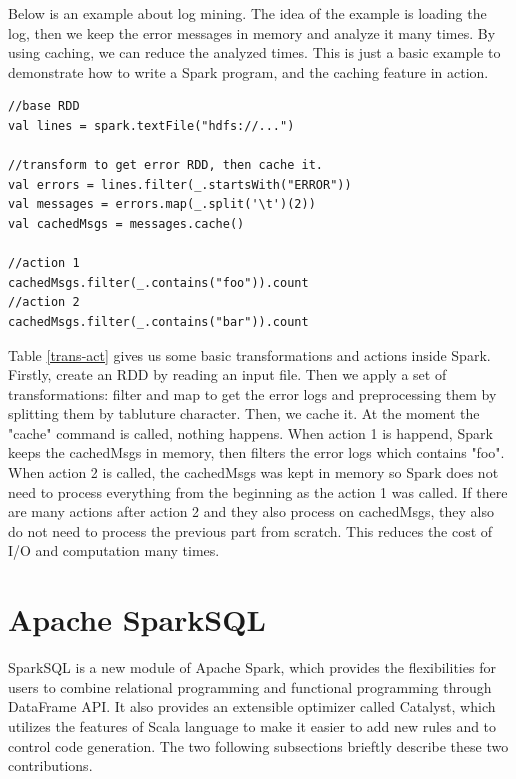 Below is an example about log mining. The idea of the example is loading the log, then we keep the error messages in memory and analyze it many times. By using caching, we can reduce the analyzed times. This is just a basic example to demonstrate how to write a Spark program, and the caching feature in action.

\begin{lstlisting}
//base RDD
val lines = spark.textFile("hdfs://...")

//transform to get error RDD, then cache it.
val errors = lines.filter(_.startsWith("ERROR"))
val messages = errors.map(_.split('\t')(2))
val cachedMsgs = messages.cache()

//action 1
cachedMsgs.filter(_.contains("foo")).count
//action 2
cachedMsgs.filter(_.contains("bar")).count
\end{lstlisting}

Table \ref{trans-act} gives us some basic transformations and actions inside Spark.\\

Firstly, create an RDD by reading an input file. Then we apply a set of transformations: filter and map to get the error logs and preprocessing them by splitting them by tabluture character. Then, we cache it. At the moment the "cache" command is called, nothing happens. When action 1 is happend, Spark keeps the cachedMsgs in memory, then filters the error logs which contains "foo". When action 2 is called, the cachedMsgs was kept in memory so Spark does not need to process everything from the beginning as the action 1 was called. If there are many actions after action 2 and they also process on cachedMsgs, they also do not need to process the previous part from scratch. This reduces the cost of I/O and computation many times.


\section{Apache SparkSQL}
SparkSQL is a new module of Apache Spark, which provides the flexibilities for users to combine relational programming and functional programming through DataFrame API. It also provides an extensible optimizer called Catalyst, which utilizes the features of Scala language to make it easier to add new rules and to control code generation. The two following subsections brieftly describe these two contributions.\\


